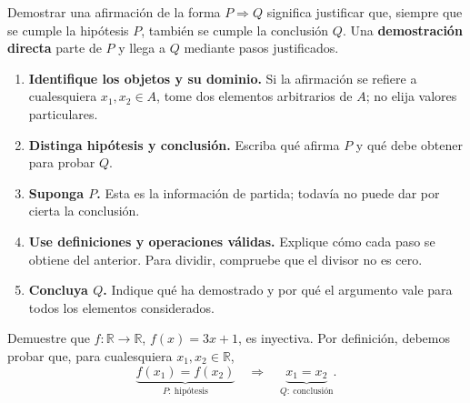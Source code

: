 \documentclass[10pt,a5paper]{article}
\newif\ifmostrarSoluciones
\begin{document}

\begin{resumen}
Demostrar una afirmación de la forma $P\Longrightarrow Q$ significa justificar que, siempre que se cumple la hipótesis $P$, también se cumple la conclusión $Q$. Una \textbf{demostración directa} parte de $P$ y llega a $Q$ mediante pasos justificados.
\end{resumen}

\begin{nota}
\begin{enumerate}
  \item \textbf{Identifique los objetos y su dominio.} Si la afirmación se refiere a cualesquiera $x_1,x_2\in A$, tome dos elementos arbitrarios de $A$; no elija valores particulares.
  \item \textbf{Distinga hipótesis y conclusión.} Escriba qué afirma $P$ y qué debe obtener para probar $Q$.
  \item \textbf{Suponga $P$.} Esta es la información de partida; todavía no puede dar por cierta la conclusión.
  \item \textbf{Use definiciones y operaciones válidas.} Explique cómo cada paso se obtiene del anterior. Para dividir, compruebe que el divisor no es cero.
  \item \textbf{Concluya $Q$.} Indique qué ha demostrado y por qué el argumento vale para todos los elementos considerados.
\end{enumerate}
\end{nota}

\begin{ejemplo}
Demuestre que $f:\mathbb{R}\to\mathbb{R}$, $f(x)=3x+1$, es inyectiva. Por definición, debemos probar que, para cualesquiera $x_1,x_2\in\mathbb{R}$,
\[
\underbrace{f(x_1)=f(x_2)}_{P:\ \text{hipótesis}}
\quad\Longrightarrow\quad
\underbrace{x_1=x_2}_{Q:\ \text{conclusión}}.
\]
\end{ejemplo}
\ifmostrarSoluciones
\begin{solucion}
Sean $x_1,x_2\in\mathbb{R}$ arbitrarios y supongamos que $f(x_1)=f(x_2)$. En cada fila, la indicación de la derecha explica cómo pasar a la siguiente igualdad:
\[
\renewcommand{\arraystretch}{1.5}
\begin{array}{rcl@{\qquad}r}
f(x_1) & = & f(x_2)
  & \text{Usamos la ley de asignación de }f. \\
3x_1+1 & = & 3x_2+1
  & \text{Restamos }1\text{ a ambos lados.} \\
3x_1 & = & 3x_2
  & \text{Dividimos entre }3\neq0. \\
x_1 & = & x_2
  & \text{Obtenemos la conclusión }Q.
\end{array}
\]

Así, la hipótesis $P$ implica la conclusión $Q$. Como $x_1$ y $x_2$ eran arbitrarios, la implicación vale para todos los pares del dominio; por tanto, $f$ es inyectiva.
\end{solucion}
\else\vspace{28mm}\fi
\end{document}
